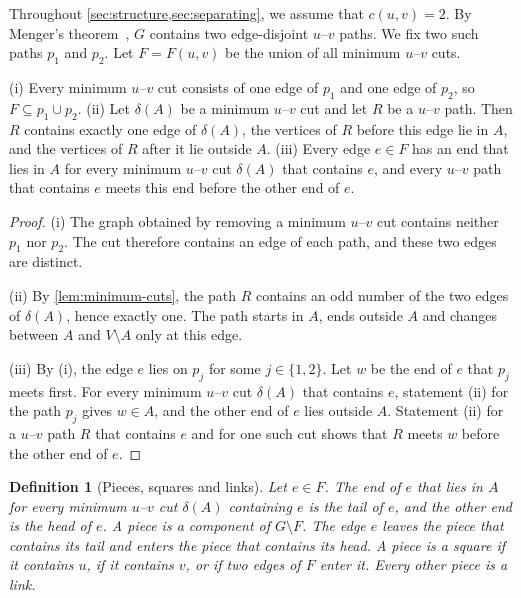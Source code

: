 \documentclass[pdflatex,sn-mathphys-num]{sn-jnl}%
\theoremstyle{thmstyleone}%
\theoremstyle{thmstyletwo}%
\theoremstyle{thmstylethree}%
\newtheorem{definition}{Definition}%
\begin{document}
Throughout \cref{sec:structure,sec:separating}, we assume that $c(u, v) = 2$.
By Menger's theorem~\cite[Corollary~3.3.5]{Diestel2025}, $G$ contains two edge-disjoint $u$--$v$ paths.
We fix two such paths $p_1$ and $p_2$.
Let $F = F(u, v)$ be the union of all minimum $u$--$v$ cuts.

\begin{lemma}
\label{lem:orientation}
(i) Every minimum $u$--$v$ cut consists of one edge of $p_1$ and one edge of $p_2$, so $F \subseteq p_1 \cup p_2$.
(ii) Let $\delta(A)$ be a minimum $u$--$v$ cut and let $R$ be a $u$--$v$ path.
Then $R$ contains exactly one edge of $\delta(A)$, the vertices of $R$ before this edge lie in $A$, and the vertices of $R$ after it lie outside $A$.
(iii) Every edge $e \in F$ has an end that lies in $A$ for every minimum $u$--$v$ cut $\delta(A)$ that contains $e$, and every $u$--$v$ path that contains $e$ meets this end before the other end of $e$.
\end{lemma}

\begin{proof}
(i) The graph obtained by removing a minimum $u$--$v$ cut contains neither $p_1$ nor $p_2$.
The cut therefore contains an edge of each path, and these two edges are distinct.

(ii) By \cref{lem:minimum-cuts}, the path $R$ contains an odd number of the two edges of $\delta(A)$, hence exactly one.
The path starts in $A$, ends outside $A$ and changes between $A$ and $V \setminus A$ only at this edge.

(iii) By (i), the edge $e$ lies on $p_j$ for some $j \in \{1, 2\}$.
Let $w$ be the end of $e$ that $p_j$ meets first.
For every minimum $u$--$v$ cut $\delta(A)$ that contains $e$, statement (ii) for the path $p_j$ gives $w \in A$, and the other end of $e$ lies outside $A$.
Statement (ii) for a $u$--$v$ path $R$ that contains $e$ and for one such cut shows that $R$ meets $w$ before the other end of $e$.
\end{proof}

\begin{definition}[Pieces, squares and links]
\label{def:pieces}
Let $e \in F$.
The end of $e$ that lies in $A$ for every minimum $u$--$v$ cut $\delta(A)$ containing $e$ is the \emph{tail} of $e$, and the other end is the \emph{head} of $e$.
A \emph{piece} is a component of $G \setminus F$.
The edge $e$ \emph{leaves} the piece that contains its tail and \emph{enters} the piece that contains its head.
A piece is a \emph{square} if it contains $u$, if it contains $v$, or if two edges of $F$ enter it.
Every other piece is a \emph{link}.
\end{definition}
\end{document}
